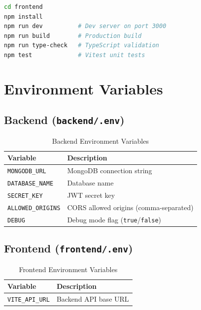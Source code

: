 \documentclass[11pt,a4paper]{report}
\begin{document}
\begin{lstlisting}[language=bash]
cd frontend
npm install
npm run dev          # Dev server on port 3000
npm run build        # Production build
npm run type-check   # TypeScript validation
npm test             # Vitest unit tests
\end{lstlisting}

\section{Environment Variables}

\subsection{Backend (\texttt{backend/.env})}

\begin{table}[h]
    \centering
    \begin{tabularx}{\textwidth}{|l|X|}
        \hline
        \textbf{Variable}         & \textbf{Description}                           \\
        \hline
        \texttt{MONGODB\_URL}     & MongoDB connection string                      \\
        \hline
        \texttt{DATABASE\_NAME}   & Database name                                  \\
        \hline
        \texttt{SECRET\_KEY}      & JWT secret key                                 \\
        \hline
        \texttt{ALLOWED\_ORIGINS} & CORS allowed origins (comma-separated)         \\
        \hline
        \texttt{DEBUG}            & Debug mode flag (\texttt{true}/\texttt{false}) \\
        \hline
    \end{tabularx}
    \caption{Backend Environment Variables}
\end{table}

\subsection{Frontend (\texttt{frontend/.env})}

\begin{table}[h]
    \centering
    \begin{tabularx}{\textwidth}{|l|X|}
        \hline
        \textbf{Variable}       & \textbf{Description} \\
        \hline
        \texttt{VITE\_API\_URL} & Backend API base URL \\
        \hline
    \end{tabularx}
    \caption{Frontend Environment Variables}
\end{table}
\end{document}
